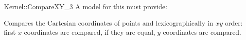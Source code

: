 \begin{ccRefFunctionObjectConcept}{Kernel::CompareXY_3}
A model for this must provide:


      {Compares the Cartesian coordinates of points  and
        lexicographically in $xy$ order: first 
       $x$-coordinates are compared, if they are equal, $y$-coordinates
       are compared.}

\ccSeeAlso
{}  \\

\end{ccRefFunctionObjectConcept}
